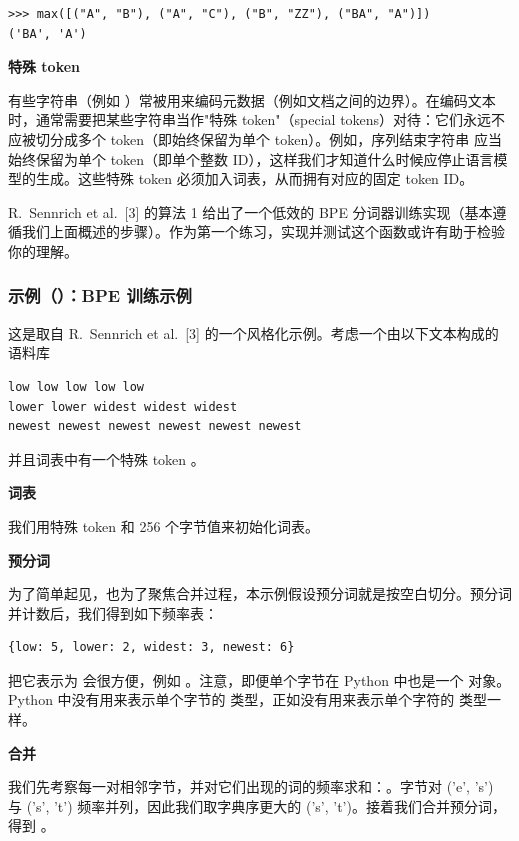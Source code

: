 \begin{lstlisting}
>>> max([("A", "B"), ("A", "C"), ("B", "ZZ"), ("BA", "A")])
('BA', 'A')
\end{lstlisting}

\textbf{特殊 token}

有些字符串（例如 ）常被用来编码元数据（例如文档之间的边界）。在编码文本时，通常需要把某些字符串当作"特殊 token"（special tokens）对待：它们永远不应被切分成多个 token（即始终保留为单个 token）。例如，序列结束字符串  应当始终保留为单个 token（即单个整数 ID），这样我们才知道什么时候应停止语言模型的生成。这些特殊 token 必须加入词表，从而拥有对应的固定 token ID。

R.~Sennrich et al.~[3] 的算法 1 给出了一个低效的 BPE 分词器训练实现（基本遵循我们上面概述的步骤）。作为第一个练习，实现并测试这个函数或许有助于检验你的理解。

\subsubsection*{示例（）：BPE 训练示例}

这是取自 R.~Sennrich et al.~[3] 的一个风格化示例。考虑一个由以下文本构成的语料库

\begin{lstlisting}
low low low low low
lower lower widest widest widest
newest newest newest newest newest newest
\end{lstlisting}

并且词表中有一个特殊 token 。

\textbf{词表}

我们用特殊 token  和 256 个字节值来初始化词表。

\textbf{预分词}

为了简单起见，也为了聚焦合并过程，本示例假设预分词就是按空白切分。预分词并计数后，我们得到如下频率表：

\begin{lstlisting}
{low: 5, lower: 2, widest: 3, newest: 6}
\end{lstlisting}

把它表示为  会很方便，例如 。注意，即便单个字节在 Python 中也是一个  对象。Python 中没有用来表示单个字节的  类型，正如没有用来表示单个字符的  类型一样。

\textbf{合并}

我们先考察每一对相邻字节，并对它们出现的词的频率求和：。字节对 ('e', 's') 与 ('s', 't') 频率并列，因此我们取字典序更大的 ('s', 't')。接着我们合并预分词，得到 。

